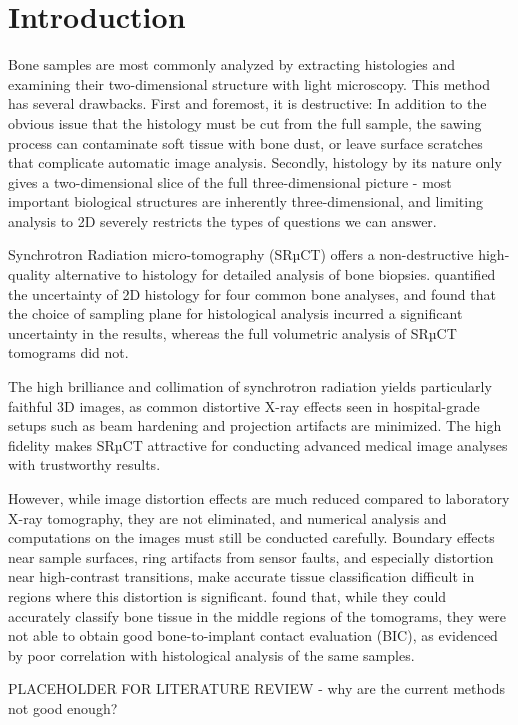 \section{Introduction}
\label{sec:intro}

Bone samples are most commonly analyzed by extracting histologies and examining
their two-dimensional structure with light microscopy. This method has several
drawbacks. First and foremost, it is destructive: In addition to the obvious
issue that the histology must be cut from the full sample, the sawing process
can contaminate soft tissue with bone dust, or leave surface scratches that
complicate automatic image analysis. Secondly, histology by its nature only
gives a two-dimensional slice of the full three-dimensional picture - most
important biological structures are inherently three-dimensional, and limiting
analysis to 2D severely restricts the types of questions we can answer.

Synchrotron Radiation micro-tomography (SRµCT) offers a non-destructive
high-quality alternative to histology for detailed analysis of bone biopsies.
\cite{torsten2018} quantified the uncertainty of 2D histology for four common
bone analyses, and found that the choice of sampling plane for histological
analysis incurred a significant uncertainty in the results, whereas the full
volumetric analysis of SRµCT tomograms did not.

The high brilliance and collimation of synchrotron radiation yields
particularly faithful 3D images, as common distortive X-ray effects seen in
hospital-grade setups such as beam hardening and projection artifacts are
minimized. The high fidelity makes SRµCT attractive for conducting advanced
medical image analyses with trustworthy results.

However, while image distortion effects are much reduced compared to laboratory
X-ray tomography, they are not eliminated, and numerical analysis and
computations on the images must still be conducted carefully. Boundary effects
near sample surfaces, ring artifacts from sensor faults, and especially
distortion near high-contrast transitions, make accurate tissue classification
difficult in regions where this distortion is significant. \cite{sporring}
found that, while they could accurately classify bone tissue in the middle
regions of the tomograms, they were not able to obtain good bone-to-implant
contact evaluation (BIC), as evidenced by poor correlation with histological
analysis of the same samples.

PLACEHOLDER FOR LITERATURE REVIEW - why are the current methods not good
enough?

